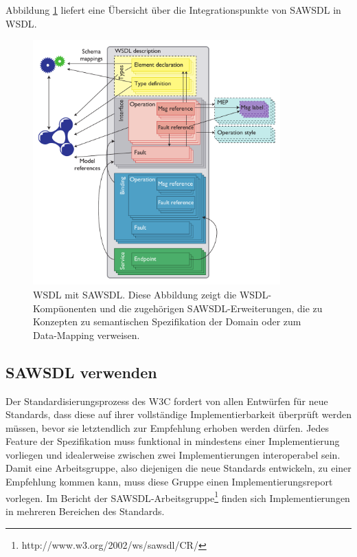 Abbildung \ref{f:sawsdl} liefert eine Übersicht über die Integrationspunkte von \ac{SAWSDL} in \ac{WSDL}.

\begin{figure}[ht]
\centering
\parbox{0.85\textwidth}{
    \includegraphics[width=0.85\textwidth]{media/sawsdl.png}
    \caption{\ac{WSDL} mit \ac{SAWSDL}. Diese Abbildung zeigt die \ac{WSDL}-Kompüonenten und die zugehörigen \ac{SAWSDL}-Erweiterungen, die zu Konzepten zu semantischen Spezifikation der Domain oder zum Data-Mapping verweisen. \cite[S.61]{ky-sawsdl}
}
    \label{f:sawsdl}
}
\end{figure}

\subsection{\ac{SAWSDL} verwenden}

Der Standardisierungsprozess des \ac{W3C} fordert von allen Entwürfen für neue Standards, dass diese auf ihrer vollständige Implementierbarkeit überprüft werden müssen, bevor sie letztendlich zur Empfehlung erhoben werden dürfen. Jedes Feature der Spezifikation muss funktional in mindestens einer Implementierung vorliegen und idealerweise zwischen zwei Implementierungen interoperabel sein. Damit eine Arbeitsgruppe, also diejenigen die neue Standards entwickeln, zu einer Empfehlung kommen kann, muss diese Gruppe einen Implementierungsreport vorlegen. Im Bericht der \ac{SAWSDL}-Arbeitsgruppe\footnote{http://www.w3.org/2002/ws/sawsdl/CR/} finden sich Implementierungen in mehreren Bereichen des Standards.

